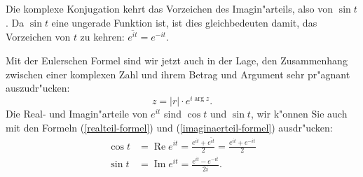 Die komplexe Konjugation kehrt das Vorzeichen des Imagin"arteils, also 
von $\sin t$. Da $\sin t$ eine ungerade Funktion ist, ist dies gleichbedeuten
damit, das Vorzeichen von $t$ zu kehren: $\overline{e^{it}}=e^{-it}$.

Mit der Eulerschen Formel sind wir jetzt auch in der Lage, den Zusammenhang
zwischen einer komplexen Zahl und ihrem Betrag und Argument sehr pr"agnant
auszudr"ucken:
\[
z=|r|\cdot e^{i\operatorname{arg}z}.
\]
Die Real- und Imagin"arteile von $e^{it}$ sind $\cos t$ und $\sin t$,
wir k"onnen Sie auch mit den Formeln (\ref{realteil-formel}) und
(\ref{imaginaerteil-formel}) ausdr"ucken:
\begin{align*}
\cos t
&=
\operatorname{Re}e^{it}
=
\frac{e^{it}+\overline{e^{it}}}2
=
\frac{e^{it}+e^{-it}}2
\\
\sin t
&=
\operatorname{Im}e^{it}=\frac{e^{it}-e^{-it}}{2i}.
\end{align*}

